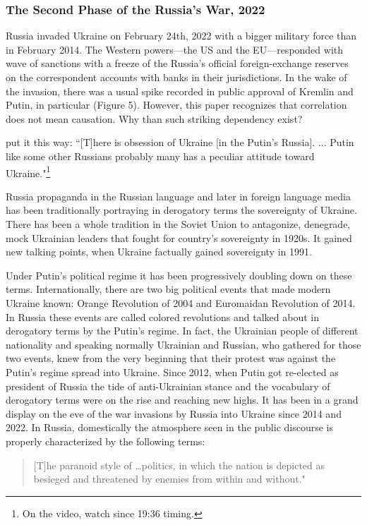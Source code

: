 \subsubsection{The Second Phase of the Russia's War, 2022}

Russia invaded Ukraine on February 24th, 2022 with a bigger military
force than in February 2014. The Western powers---the US and the
EU---responded with wave of sanctions with a freeze of the Russia's
official foreign-exchange reserves on the correspondent accounts with
banks in their jurisdictions. In the wake of the invasion, there was a
usual spike recorded in public approval of Kremlin and Putin, in
particular (Figure 5). However, this paper recognizes that correlation
does not mean causation. Why than such striking dependency exist?

\cite{dibb2022} put it this way: ``[T]here is obsession of Ukraine [in the
Putin's Russia]. ... Putin like some other Russians probably many has a
peculiar attitude toward Ukraine."\footnote{On the video, watch since 19:36 timing.}

Russia propaganda in the Russian language and later in foreign language
media has been traditionally portraying in derogatory terms the
sovereignty of Ukraine. There has been a whole tradition in the Soviet
Union to antagonize, denegrade, mock Ukrainian leaders that fought for
country's sovereignty in 1920s. It gained new talking points, when
Ukraine factually gained sovereignty in 1991.

Under Putin's political regime it has been progressively doubling down
on these terms. Internationally, there are two big political events that
made modern Ukraine known: Orange Revolution of 2004 and Euromaidan
Revolution of 2014. In Russia these events are called colored
revolutions and talked about in derogatory terms by the Putin's regime.
In fact, the Ukrainian people of different nationality and speaking
normally Ukrainian and Russian, who gathered for those two events, knew
from the very beginning that their protest was against the Putin's
regime spread into Ukraine. Since 2012, when Putin got re-elected as
president of Russia the tide of anti-Ukrainian stance and the vocabulary
of derogatory terms were on the rise and reaching new highs. It has been
in a grand display on the eve of the war invasions by Russia into
Ukraine since 2014 and 2022. In Russia, domestically the atmosphere seen
in the public discourse is properly characterized by the following
terms:

\begin{quote}
[T]he paranoid style of \dots politics, in which the nation is
depicted as besieged and threatened by enemies from within and
without."~\citep[pp.~82-83]{dharvey}
\end{quote}

